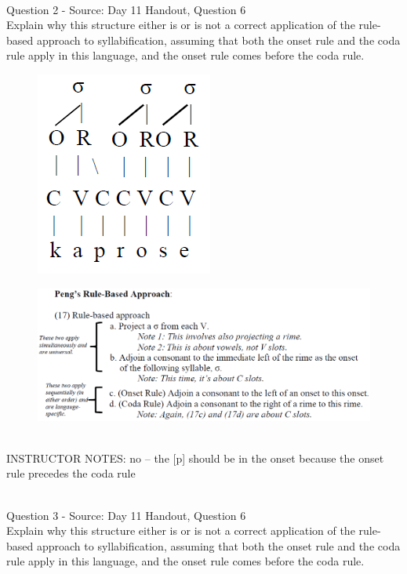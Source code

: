 \documentclass[12pt]{article}
\begin{document}
~\\

{\large Question 2} - Source: Day 11 Handout, Question 6\\

Explain why this structure either is or is not a correct application of the rule-based approach to syllabification, assuming that both the onset rule and the coda rule apply in this language, and the onset rule comes before the coda rule.\\

\begin{figure}[H]
\includegraphics{../images/pengrules_kaprose_no.png}
\end{figure}
\begin{figure}[H]
\includegraphics{../images/peng_rules.png}
\end{figure}

~\\
INSTRUCTOR NOTES: no -- the [p] should be in the onset because the onset rule precedes the coda rule


~\\

{\large Question 3} - Source: Day 11 Handout, Question 6\\

Explain why this structure either is or is not a correct application of the rule-based approach to syllabification, assuming that both the onset rule and the coda rule apply in this language, and the onset rule comes before the coda rule.\\
\end{document}
